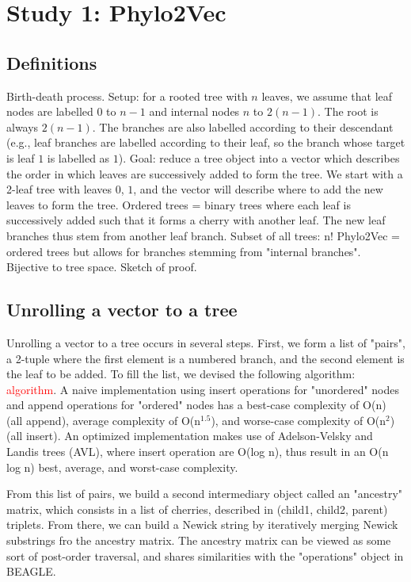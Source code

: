 \section{Study 1: Phylo2Vec}
\subsection{Definitions}
Birth-death process.
Setup: for a rooted tree with $n$ leaves, we assume that leaf nodes are labelled 0 to $n-1$ and internal nodes $n$ to $2(n-1)$. The root is always $2(n-1)$. The branches are also labelled according to their descendant (e.g., leaf branches are labelled according to their leaf, so the branch whose target is leaf $1$ is labelled as $1$).
Goal: reduce a tree object into a vector which describes the order in which leaves are successively added to form the tree. We start with a 2-leaf tree with leaves $0$, $1$, and the vector will describe where to add the new leaves to form the tree.
Ordered trees = binary trees where each leaf is successively added such that it forms a cherry with another leaf. The new leaf branches thus stem from another leaf branch. Subset of all trees: n!
Phylo2Vec = ordered trees but allows for branches stemming from "internal branches". Bijective to tree space. Sketch of proof.
\subsection{Unrolling a vector to a tree}
Unrolling a vector to a tree occurs in several steps. First, we form a list of "pairs", a 2-tuple where the first element is a numbered branch, and the second element is the leaf to be added. To fill the list, we devised the following algorithm: \textcolor{red}{algorithm}. A naive implementation using insert operations for "unordered" nodes and append operations for "ordered" nodes has a best-case complexity of O(n) (all append), average complexity of O(n$^1.5$), and worse-case complexity of O(n$^2$) (all insert). An optimized implementation makes use of Adelson-Velsky and Landis trees (AVL), where insert operation are O(log n), thus result in an O(n log n) best, average, and worst-case complexity.

From this list of pairs, we build a second intermediary object called an "ancestry" matrix, which consists in a list of cherries, described in (child1, child2, parent) triplets. From there, we can build a Newick string by iteratively merging Newick substrings fro the ancestry matrix. The ancestry matrix can be viewed as some sort of post-order traversal, and shares similarities with the "operations" object in BEAGLE.

